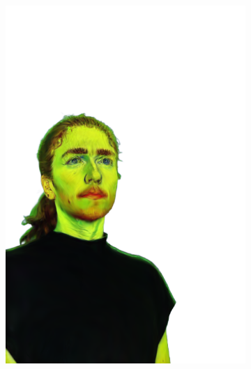 \begin{figure}[ht]
\begin{subfigure}{0.08\linewidth}
        \includegraphics[width=\textwidth]{Figures/results/low/irene_vangogh/11_render.png}

\end{subfigure}
\end{figure}

